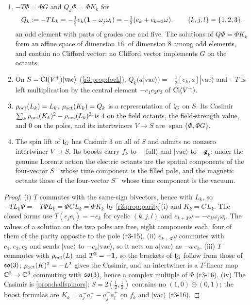\begin{proposition}
\label{r3:prop:odd}
\begin{enumerate}[label=(\roman*),leftmargin=2.2em]
\item $-T\Phi=\Phi G$ and $Q_k\Phi=\Phi K_k$ for
\[
Q_k:=-TL_k=-\tfrac12e_k(\mathbf 1-\omega_j\omega_l)=-\tfrac12(e_k+e_{k+3}\omega),\qquad\{k,j,l\}=\{1,2,3\},
\]
an odd element with parts of grades one and five. The solutions of $Q\Phi=\Phi K_k$ form an affine space of dimension $16$, of dimension $8$
among odd elements, and contain no Clifford vector; no Clifford vector implements $G$ on the octants.
\item On $S=\mathrm{Cl}(V^+)|\mathrm{vac}\rangle$ (\cref{r3:prop:fock}), $Q_k(a|\mathrm{vac}\rangle)=-\tfrac12[e_k,a]|\mathrm{vac}\rangle$ and $-T$ is left multiplication by the
central element $-e_1e_2e_3$ of $\mathrm{Cl}(V^+)$.
\item $\rho_{\rm oct}(L_k)=L_k$, $\rho_{\rm oct}(K_k)=Q_k$ is a representation of $\mathfrak l_G$ on $S$. Its Casimir $\sum_k\rho_{\rm oct}(K_k)^2-\rho_{\rm oct}(L_k)^2$
is $4$ on the field octants, the field-strength value, and $0$ on the poles, and its intertwiners $V\to S$ are $\operatorname{span}\{\Phi,\Phi G\}$.
\item The spin lift of $\mathfrak l_G$ has Casimir $3$ on all of $S$ and admits no nonzero intertwiner $V\to S$. Its boosts carry $f_k$ to $-|\mathrm{full}\rangle$
and $|\mathrm{vac}\rangle$ to $-\mathsf g_k$: under the genuine Lorentz action the electric octants are the spatial components of the four-vector $S^+$
whose time component is the filled pole, and the magnetic octants those of the four-vector $S^-$ whose time component is the vacuum.
\end{enumerate}
\end{proposition}

\begin{proof}
(i) $T$ commutes with the same-sign bivectors, hence with $L_k$, so $-TL_k\Phi=-T\Phi L_k=\Phi GL_k=\Phi K_k$ by \cref{r3:prop:parity}(i) and $K_k=GL_k$.
The closed forms use $T(e_je_l)=-e_k$ for cyclic $(k,j,l)$ and $e_{k+3}\omega=-e_k\omega_j\omega_l$. The values of a solution on the two poles are free, eight
components each, four of them of the parity opposite to the pole (r3-15). (ii) $e_{k+3}\omega$ commutes with $e_1,e_2,e_3$ and sends $|\mathrm{vac}\rangle$ to $-e_k|\mathrm{vac}\rangle$,
so it acts on $a|\mathrm{vac}\rangle$ as $-a\,e_k$. (iii) $T$ commutes with $\rho_{\rm oct}(L)$ and $T^2=-\mathbf 1$, so the brackets of $\mathfrak l_G$ follow from
those of $\mathfrak{so}(3)$; $\rho_{\rm oct}(K)^2=-L^2$ gives the Casimir, and an intertwiner is a $T$-linear map $\mathbb{C}^3\to\mathbb{C}^3$ commuting with $\mathfrak{so}(3)$, hence a
complex multiple of $\Phi$ (r3-16). (iv) The Casimir is \cref{prop:halfspinors}; $S=2(\tfrac12,\tfrac12)$ contains no
$(1,0)\oplus(0,1)$; the boost formulas are $K_k=a^-_ja^-_l-a^+_ja^+_l$ on $f_k$ and $|\mathrm{vac}\rangle$ (r3-16).
\end{proof}

